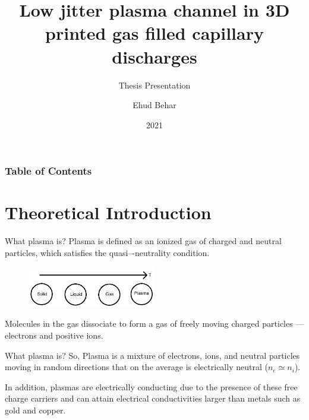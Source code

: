 \documentclass[draft]{beamer}
\title{Low jitter plasma channel in 3D printed gas filled capillary discharges}
\subtitle{Thesis Presentation}
\author{Ehud Behar}
\institute{Hebrew University of Jerusalem}
\date{2021}
\begin{document}
\frame{\titlepage}
\begin{frame}
\frametitle{Table of Contents}
\tableofcontents
\end{frame}

\section{Theoretical Introduction}
\newcommand{\whatisplasma}{What plasma is?}
\begin{frame}{\whatisplasma}
Plasma is defined as an ionized gas of charged and neutral particles, which  satisfies  the quasi–-neutrality condition.
\begin{figure}
    \centering
    \includegraphics[width=0.5\textwidth]{presentation/temp_and_states.png}
\end{figure}
Molecules in the gas dissociate to form a gas of freely moving charged particles --- electrons and positive ions.
\end{frame}
\begin{frame}{\whatisplasma}
So, Plasma is a mixture of electrons, ions, and neutral particles moving in random directions that on the average is electrically neutral ($n_e \simeq n_i$).

In addition, plasmas are electrically conducting due to the presence of these free charge carriers and can attain electrical conductivities larger than metals such as gold and copper.
\end{frame}
\end{document}
